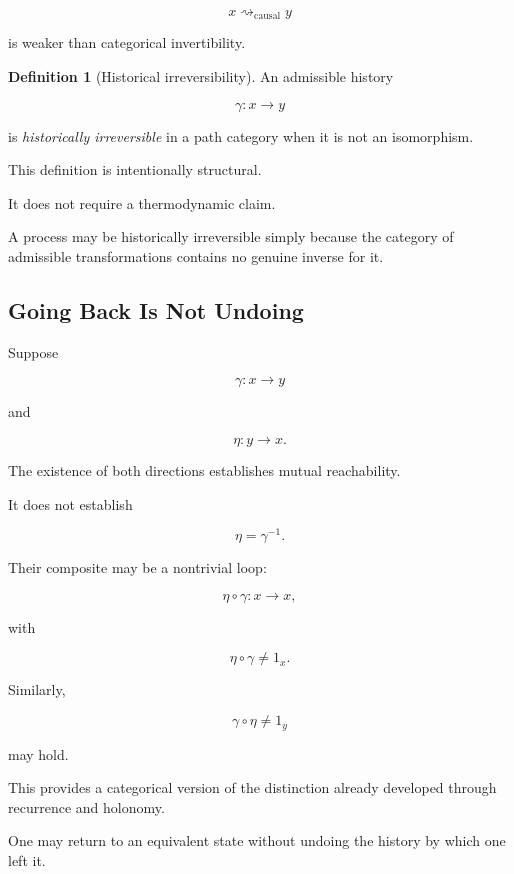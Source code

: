 \documentclass[
  11pt,
  a4paper,
  DIV=12,
  BCOR=0mm,
  parskip=half-
]{scrartcl}
\newcommand{\leadcausal}{%
  \mathrel{\rightsquigarrow_{\mathrm{causal}}}%
}
\theoremstyle{definition}
\newtheorem{definition}{Definition}[section]
\theoremstyle{plain}
\theoremstyle{remark}
\begin{document}
\[
  x\leadcausal y
\]

is weaker than categorical invertibility.

\begin{definition}[Historical irreversibility]
\label{def:historical-irreversibility}
An admissible history

\[
  \gamma:x\to y
\]

is \emph{historically irreversible} in a path category when it is not an
isomorphism.
\end{definition}

This definition is intentionally structural.

It does not require a thermodynamic claim.

A process may be historically irreversible simply because the category of
admissible transformations contains no genuine inverse for it.


\subsection{Going Back Is Not Undoing}
\label{app:going-back}

Suppose

\[
  \gamma:x\to y
\]

and

\[
  \eta:y\to x.
\]

The existence of both directions establishes mutual reachability.

It does not establish

\[
  \eta=\gamma^{-1}.
\]

Their composite may be a nontrivial loop:

\[
  \eta\circ\gamma:x\to x,
\]

with

\[
  \eta\circ\gamma\neq1_x.
\]

Similarly,

\[
  \gamma\circ\eta\neq1_y
\]

may hold.

This provides a categorical version of the distinction already developed
through recurrence and holonomy.

One may return to an equivalent state without undoing the history by which one
left it.
\end{document}
